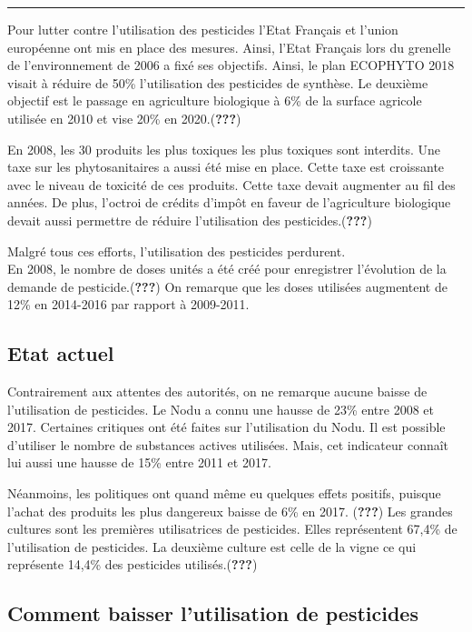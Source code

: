 \documentclass[11pt,]{article}
\begin{document}
\noindent

\rule[0.5ex]{\linewidth}{1pt}

Pour lutter contre l'utilisation des pesticides l'Etat Français et
l'union européenne ont mis en place des mesures. Ainsi, l'Etat Français
lors du grenelle de l'environnement de 2006 a fixé ses objectifs. Ainsi,
le plan ECOPHYTO 2018 visait à réduire de 50\% l'utilisation des
pesticides de synthèse. Le deuxième objectif est le passage en
agriculture biologique à 6\% de la surface agricole utilisée en 2010 et
vise 20\% en 2020.({\textbf{???}})

En 2008, les 30 produits les plus toxiques les plus toxiques sont
interdits. Une taxe sur les phytosanitaires a aussi été mise en place.
Cette taxe est croissante avec le niveau de toxicité de ces produits.
Cette taxe devait augmenter au fil des années. De plus, l'octroi de
crédits d'impôt en faveur de l'agriculture biologique devait aussi
permettre de réduire l'utilisation des pesticides.({\textbf{???}})

Malgré tous ces efforts, l'utilisation des pesticides perdurent.\\
En 2008, le nombre de doses unités a été créé pour enregistrer
l'évolution de la demande de pesticide.({\textbf{???}}) On remarque que
les doses utilisées augmentent de 12\% en 2014-2016 par rapport à
2009-2011.

\hypertarget{etat-actuel}{%
\subsection{Etat actuel}\label{etat-actuel}}

Contrairement aux attentes des autorités, on ne remarque aucune baisse
de l'utilisation de pesticides. Le Nodu a connu une hausse de 23\% entre
2008 et 2017. Certaines critiques ont été faites sur l'utilisation du
Nodu. Il est possible d'utiliser le nombre de substances actives
utilisées. Mais, cet indicateur connaît lui aussi une hausse de 15\%
entre 2011 et 2017.

Néanmoins, les politiques ont quand même eu quelques effets positifs,
puisque l'achat des produits les plus dangereux baisse de 6\% en 2017.
({\textbf{???}}) Les grandes cultures sont les premières utilisatrices
de pesticides. Elles représentent 67,4\% de l'utilisation de pesticides.
La deuxième culture est celle de la vigne ce qui représente 14,4\% des
pesticides utilisés.({\textbf{???}})

\hypertarget{comment-baisser-lutilisation-de-pesticides}{%
\subsection{Comment baisser l'utilisation de
pesticides}\label{comment-baisser-lutilisation-de-pesticides}}
\end{document}
